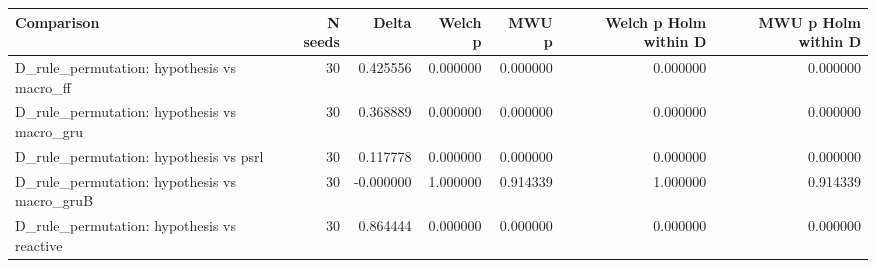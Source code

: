 \begin{tabular}{lrrrrrr}
\toprule
Comparison & N seeds & Delta & Welch p & MWU p & Welch p Holm within D & MWU p Holm within D \\
\midrule
D\_rule\_permutation: hypothesis vs macro\_ff & 30 & 0.425556 & 0.000000 & 0.000000 & 0.000000 & 0.000000 \\
D\_rule\_permutation: hypothesis vs macro\_gru & 30 & 0.368889 & 0.000000 & 0.000000 & 0.000000 & 0.000000 \\
D\_rule\_permutation: hypothesis vs psrl & 30 & 0.117778 & 0.000000 & 0.000000 & 0.000000 & 0.000000 \\
D\_rule\_permutation: hypothesis vs macro\_gruB & 30 & -0.000000 & 1.000000 & 0.914339 & 1.000000 & 0.914339 \\
D\_rule\_permutation: hypothesis vs reactive & 30 & 0.864444 & 0.000000 & 0.000000 & 0.000000 & 0.000000 \\
\bottomrule
\end{tabular}
